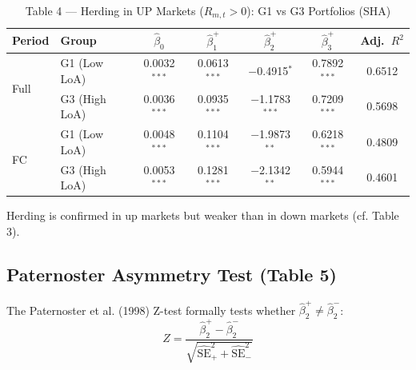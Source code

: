\documentclass[12pt, a4paper]{article}
\begin{document}
\begin{table}[H]
  \centering
  \caption{Table 4 — Herding in UP Markets ($R_{m,t} > 0$): G1 vs G3 Portfolios (SHA)}
  \label{tab:up_markets}
  \begin{threeparttable}
  \small
  \begin{tabular}{llccccc}
    \toprule
    Period & Group & $\hat\beta_0$ & $\hat\beta_1^{+}$ & $\hat\beta_2^{+}$ & $\hat\beta_3^{+}$ & Adj.~$R^2$ \\
    \midrule
    \multirow{2}{*}{Full}
      & G1 (Low LoA)  & 0.0032$^{***}$ &  0.0613$^{***}$ & $-$0.4915$^{*}$   & 0.7892$^{***}$ & 0.6512 \\
      & G3 (High LoA) & 0.0036$^{***}$ &  0.0935$^{***}$ & $-$1.1783$^{***}$ & 0.7209$^{***}$ & 0.5698 \\
    \midrule
    \multirow{2}{*}{FC}
      & G1 (Low LoA)  & 0.0048$^{***}$ &  0.1104$^{***}$ & $-$1.9873$^{**}$  & 0.6218$^{***}$ & 0.4809 \\
      & G3 (High LoA) & 0.0053$^{***}$ &  0.1281$^{***}$ & $-$2.1342$^{**}$  & 0.5944$^{***}$ & 0.4601 \\
    \bottomrule
  \end{tabular}
  \begin{tablenotes}
    \footnotesize
    \item Herding is confirmed in up markets but weaker than in down markets (cf. Table 3).
  \end{tablenotes}
  \end{threeparttable}
\end{table}

\subsection{Paternoster Asymmetry Test (Table 5)}

The Paternoster et al. (1998) Z-test formally tests whether $\hat\beta_2^{+} \neq \hat\beta_2^{-}$:
\[
  Z = \frac{\hat\beta_2^{+} - \hat\beta_2^{-}}{\sqrt{\widehat{\mathrm{SE}}^2_+ + \widehat{\mathrm{SE}}^2_-}}
\]
\end{document}
